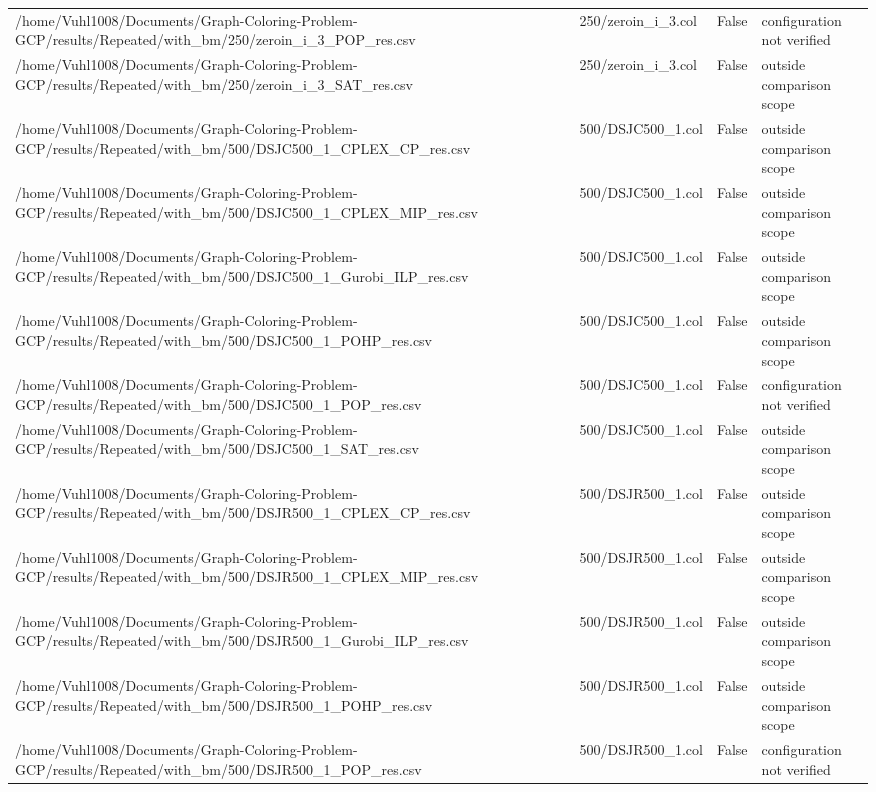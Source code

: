 \begin{table}[htbp]
\begin{tabular}{llll}
/home/Vuhl1008/Documents/Graph-Coloring-Problem-GCP/results/Repeated/with\_bm/250/zeroin\_i\_3\_POP\_res.csv & 250/zeroin\_i\_3.col & False & configuration not verified \\
/home/Vuhl1008/Documents/Graph-Coloring-Problem-GCP/results/Repeated/with\_bm/250/zeroin\_i\_3\_SAT\_res.csv & 250/zeroin\_i\_3.col & False & outside comparison scope \\
/home/Vuhl1008/Documents/Graph-Coloring-Problem-GCP/results/Repeated/with\_bm/500/DSJC500\_1\_CPLEX\_CP\_res.csv & 500/DSJC500\_1.col & False & outside comparison scope \\
/home/Vuhl1008/Documents/Graph-Coloring-Problem-GCP/results/Repeated/with\_bm/500/DSJC500\_1\_CPLEX\_MIP\_res.csv & 500/DSJC500\_1.col & False & outside comparison scope \\
/home/Vuhl1008/Documents/Graph-Coloring-Problem-GCP/results/Repeated/with\_bm/500/DSJC500\_1\_Gurobi\_ILP\_res.csv & 500/DSJC500\_1.col & False & outside comparison scope \\
/home/Vuhl1008/Documents/Graph-Coloring-Problem-GCP/results/Repeated/with\_bm/500/DSJC500\_1\_POHP\_res.csv & 500/DSJC500\_1.col & False & outside comparison scope \\
/home/Vuhl1008/Documents/Graph-Coloring-Problem-GCP/results/Repeated/with\_bm/500/DSJC500\_1\_POP\_res.csv & 500/DSJC500\_1.col & False & configuration not verified \\
/home/Vuhl1008/Documents/Graph-Coloring-Problem-GCP/results/Repeated/with\_bm/500/DSJC500\_1\_SAT\_res.csv & 500/DSJC500\_1.col & False & outside comparison scope \\
/home/Vuhl1008/Documents/Graph-Coloring-Problem-GCP/results/Repeated/with\_bm/500/DSJR500\_1\_CPLEX\_CP\_res.csv & 500/DSJR500\_1.col & False & outside comparison scope \\
/home/Vuhl1008/Documents/Graph-Coloring-Problem-GCP/results/Repeated/with\_bm/500/DSJR500\_1\_CPLEX\_MIP\_res.csv & 500/DSJR500\_1.col & False & outside comparison scope \\
/home/Vuhl1008/Documents/Graph-Coloring-Problem-GCP/results/Repeated/with\_bm/500/DSJR500\_1\_Gurobi\_ILP\_res.csv & 500/DSJR500\_1.col & False & outside comparison scope \\
/home/Vuhl1008/Documents/Graph-Coloring-Problem-GCP/results/Repeated/with\_bm/500/DSJR500\_1\_POHP\_res.csv & 500/DSJR500\_1.col & False & outside comparison scope \\
/home/Vuhl1008/Documents/Graph-Coloring-Problem-GCP/results/Repeated/with\_bm/500/DSJR500\_1\_POP\_res.csv & 500/DSJR500\_1.col & False & configuration not verified \\

\end{tabular}
\end{table}
